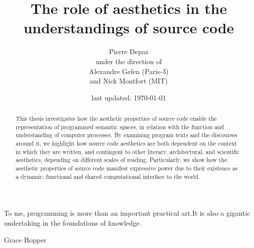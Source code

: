\documentclass{report}
\begin{document}
\title{The role of aesthetics in the understandings of source code}
\author{Pierre Depaz\\under the direction of\\Alexandre Gefen (Paris-3)\\and Nick Montfort (MIT)}
\date{last updated: \today}
\maketitle

\begin{abstract}
    This thesis investigates how the aesthetic properties of source code enable the representation of programmed semantic spaces, in relation with the function and understanding of computer processes. By examining program texts and the discourses around it, we highlight how source code aesthetics are both dependent on the context in which they are written, and contingent to other literary, architectural, and scientific aesthetics, depending on different scales of reading. Particularly, we show how the aesthetic properties of source code manifest expressive power due to their existence as a dynamic, functional and shared computational interface to the world.
\end{abstract}

\tableofcontents

\renewcommand{\textflush}{flushright}
\setlength{\epigraphwidth}{0.5\textwidth}
\epigraph{To me, programming is more than an important practical art.\linebreak \linebreak It is also a gigantic undertaking in the foundations of knowledge.}{Grace Hopper}












\listoflistings
\end{document}
